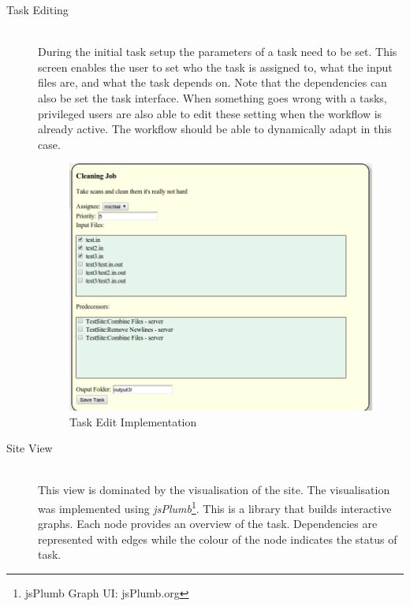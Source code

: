 \documentclass[12pt,a4paper]{report}
\begin{document}
\begin{description}
\item[Task Editing] \hfill \\
    During the initial task setup the parameters of a task need to be set. This screen enables
    the user to set who the task is assigned to, what the input files are, and what the task
    depends on. Note that the dependencies can also be set the task interface.
    When something goes wrong with a tasks, privileged users are also able to edit these setting
    when the workflow is already active. The workflow should be able to dynamically adapt in this case.
    \begin{figure}[!h]
        \begin{center}
            \includegraphics[scale=0.35]{figures/task_edit_impl2.png}
        \end{center}
        \caption{Task Edit Implementation}
        \label{task_edit_impl2}
    \end{figure}
\item[Site View] \hfill \\
    This view is dominated by the visualisation of the site. The visualisation
    was implemented using \emph{jsPlumb}\footnote{jsPlumb Graph UI:
    jsPlumb.org}. This is a library that builds interactive graphs. Each node
    provides an overview of the task. Dependencies are represented with edges
    while the colour of the node indicates the status of task.
    \begin{figure}[!h]
        \begin{center}

\end{center}
\end{figure}
\end{description}
\end{document}
